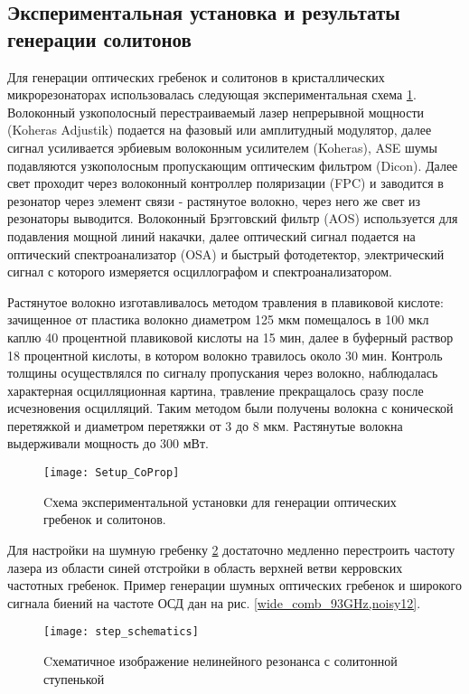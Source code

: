 \subsection{Экспериментальная установка и результаты генерации солитонов}

Для генерации оптических гребенок и солитонов в кристаллических микрорезонаторах использовалась следующая экспериментальная схема \ref{Setup_CoProp}. Волоконный узкополосный перестраиваемый лазер непрерывной мощности (Koheras Adjustik) подается на фазовый или амплитудный модулятор, далее сигнал усиливается эрбиевым волоконным усилителем (Koheras), ASE шумы подавляются узкополосным пропускающим оптическим фильтром (Dicon). Далее свет проходит через волоконный контроллер поляризации (FPC) и заводится в резонатор через элемент связи - растянутое волокно, через него же свет из резонаторы выводится. Волоконный Брэгговский фильтр (AOS) используется для подавления мощной линий накачки, далее оптический сигнал подается на оптический спектроанализатор (OSA) и быстрый фотодетектор, электрический сигнал с которого измеряется осциллографом и спектроанализатором.

Растянутое волокно изготавливалось методом травления в плавиковой кислоте: зачищенное от пластика волокно диаметром 125 мкм помещалось в 100 мкл каплю 40 процентной плавиковой кислоты на 15 мин, далее в буферный раствор 18 процентной кислоты, в котором волокно травилось около 30 мин. Контроль толщины осуществлялся по сигналу пропускания через волокно, наблюдалась характерная осцилляционная картина, травление прекращалось сразу после исчезновения осцилляций. Таким методом были получены волокна с конической перетяжкой и диаметром перетяжки от 3 до 8 мкм. Растянутые волокна выдерживали мощность до 300 мВт.

\begin{figure}[ht]
\centering
  \texttt{[image: Setup\_CoProp]}
  \caption{Cхема экспериментальной установки для генерации оптических гребенок и солитонов.}
  \label{Setup_CoProp}
\end{figure}

Для настройки на шумную гребенку \ref{step_schematics} достаточно медленно перестроить частоту лазера из области синей отстройки в область верхней ветви керровских частотных гребенок. Пример генерации шумных оптических гребенок и широкого сигнала биений на частоте ОСД дан на рис. \ref{wide_comb_93GHz,noisy12}.

\begin{figure}[ht]
\centering
  \texttt{[image: step\_schematics]}
  \caption{Cхематичное изображение нелинейного резонанса с солитонной ступенькой}
  \label{step_schematics}
\end{figure}

